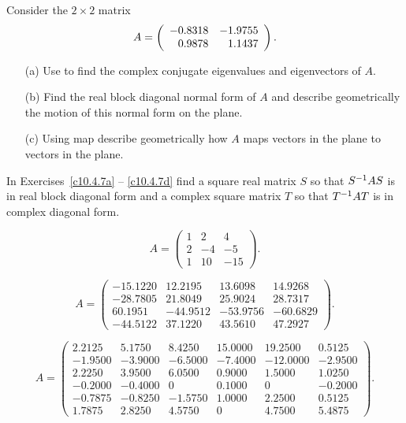 \begin{exercise} \label{c10.4.6}
Consider the $2\times 2$ matrix
\[
A = \left(\begin{array}{rr} -0.8318 & -1.9755\\ 0.9878 &1.1437\end{array}\right).
\]
\begin{itemize}
\item[(a)]  Use \Matlab to find the complex conjugate eigenvalues and 
eigenvectors of $A$.
\item[(b)]  Find the real block diagonal normal form of $A$ and describe
geometrically the motion of this normal form on the plane.
\item[(c)]  Using {\sf map} describe geometrically how $A$ maps vectors in 
the plane to vectors in the plane. 
\end{itemize}
\end{exercise}


\noindent In Exercises~\ref{c10.4.7a} -- \ref{c10.4.7d} find a square real 
matrix $S$ so that $S^{-1} AS$ is in real block diagonal form and a complex 
square matrix $T$ so that $T^{-1} AT$ is in complex diagonal form.
\begin{exercise} \label{c10.4.7a}
\begin{equation*}
A = \left(\begin{array}{rrr}
    1 &     2 &     4 \\
    2 &    -4 &    -5\\
    1 &    10 &   -15
\end{array}\right).
\end{equation*}
\end{exercise}
\begin{exercise} \label{c10.4.7b}
\begin{equation*}
A = \left(\begin{array}{rrrr}
  -15.1220 &  12.2195 &  13.6098 &  14.9268 \\
  -28.7805 &  21.8049 &  25.9024 &  28.7317 \\
   60.1951 & -44.9512 & -53.9756 & -60.6829 \\
  -44.5122 &  37.1220 &  43.5610 &  47.2927
\end{array}\right).
\end{equation*}
\end{exercise} 
\begin{exercise} \label{c10.4.7c}
\begin{equation*}
A = \left(\begin{array}{rrrrrr}
    2.2125 &    5.1750 &    8.4250 &   15.0000 &   19.2500 &    0.5125 \\
   -1.9500 &   -3.9000 &   -6.5000 &   -7.4000 &  -12.0000 &   -2.9500\\
    2.2250 &    3.9500 &    6.0500 &    0.9000 &    1.5000 &    1.0250\\
   -0.2000 &   -0.4000 &         0 &    0.1000 &         0 &   -0.2000\\
   -0.7875 &   -0.8250 &   -1.5750 &    1.0000 &    2.2500 &    0.5125\\
    1.7875 &    2.8250 &    4.5750 &         0 &    4.7500 &    5.4875
\end{array}\right).
\end{equation*}
\end{exercise}
